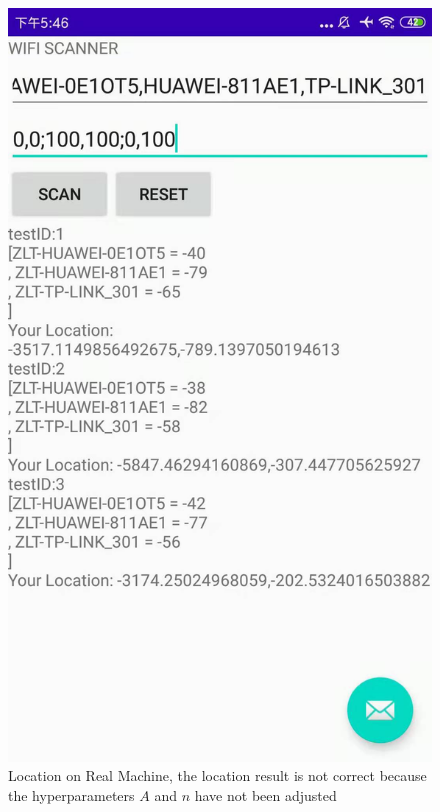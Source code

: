 \begin{figure}[t]
\begin{minipage}[t]{0.48\linewidth}
  \includegraphics[width=0.8\columnwidth]{img/real1.jpeg} 
  \caption{Location on Real Machine, the location result is not correct because the hyperparameters $A$ and $n$ have not been adjusted}
  \end{minipage}
\end{figure}

